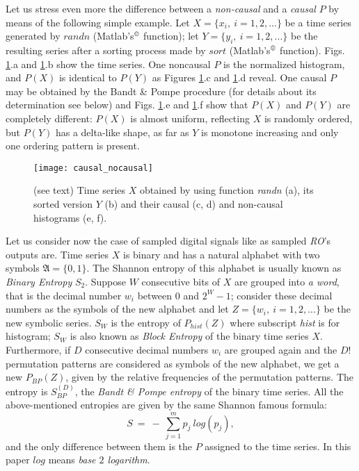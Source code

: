 Let us stress even more the difference between a \emph{non-causal} and a \emph{causal} $P$ by means of the following simple example. Let $X=\{x_i,~i=1,2,...\}$ be a time series generated by $randn$ (Matlab's$^\copyright$ function); let $Y=\{y_i,~i=1,2,...\}$ be the resulting series after a sorting process made by $sort$ (Matlab's$^\copyright$ function). Figs. \ref{fig:causal_nocausal}.a and \ref{fig:causal_nocausal}.b show the time series. One noncausal $P$ is the normalized histogram, and $P(X)$ is identical to $P(Y)$ as Figures \ref{fig:causal_nocausal}.c and \ref{fig:causal_nocausal}.d reveal. One causal $P$ may be obtained by the Bandt \& Pompe procedure (for details about its determination see below) and Figs. \ref{fig:causal_nocausal}.e and \ref{fig:causal_nocausal}.f show that $P(X)$ and $P(Y)$ are completely different: $P(X)$ is almost uniform, reflecting $X$ is randomly ordered, but $P(Y)$ has a delta-like shape, as far as $Y$ is monotone increasing and only one ordering pattern is present.

\begin{figure}
\center
\texttt{[image: causal\_nocausal]}
\caption{(see text) Time series $X$ obtained by using function \emph{randn} (a), its sorted version $Y$ (b) and their causal (c, d) and non-causal histograms (e, f).}
\label{fig:causal_nocausal}
\end{figure}

Let us consider now the case of sampled digital signals like as sampled \emph{RO}'s outputs are. Time series $X$ is binary and has a natural alphabet with two symbols
$\mathfrak{A}=\{0,1\}$. The Shannon entropy of this alphabet is usually known as \emph{Binary Entropy} $S_2$. Suppose $W$ consecutive bits of $X$ are grouped into \emph{a word}, that is the decimal number $w_i$ between $0$ and $2^W-1$; consider these decimal numbers as the symbols of the new alphabet and let $Z=\{w_i,~i=1,2,...\}$ be the new symbolic series. $S_W$ is the entropy of $P_{hist}(Z)$ where subscript \emph{hist} is for histogram; $S_W$ is also known as \emph{Block Entropy} of the binary time series $X$. Furthermore, if $D$ consecutive decimal numbers $w_i$ are grouped again and the $D!$ permutation patterns are considered as symbols of the new alphabet, we get a new $P_{BP}(Z)$, given by the relative frequencies of the permutation patterns. The entropy is $S^{(D)}_{BP}$, the \emph{Bandt \& Pompe entropy} \cite{Pompe2002} of the binary time series.
All the above-mentioned entropies are given by the same Shannon famous formula:
%
\begin{equation}
S~=~-~\sum_{j=1}^{m}{p_j~log(p_j)}, 
\end{equation}
%
and the only difference between them is the $P$ assigned to the time series. In this paper
$log$ means \emph{base $2$ logarithm}.

